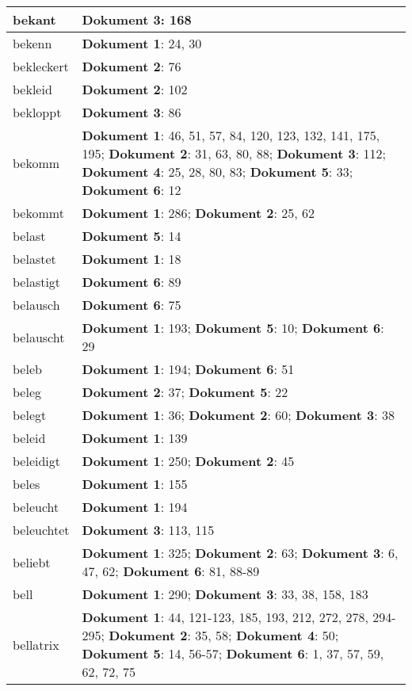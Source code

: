 \documentclass[a5paper]{article}
\begin{document}
\begin{longtable}[l]{|l|p{3in}|}
\hline
bekant & \textbf{Dokument 3}: 168 \\
\hline
bekenn & \textbf{Dokument 1}: 24, 30 \\
\hline
bekleckert & \textbf{Dokument 2}: 76 \\
\hline
bekleid & \textbf{Dokument 2}: 102 \\
\hline
bekloppt & \textbf{Dokument 3}: 86 \\
\hline
bekomm & \textbf{Dokument 1}: 46, 51, 57, 84, 120, 123, 132, 141, 175, 195; \textbf{Dokument 2}: 31, 63, 80, 88; \textbf{Dokument 3}: 112; \textbf{Dokument 4}: 25, 28, 80, 83; \textbf{Dokument 5}: 33; \textbf{Dokument 6}: 12 \\
\hline
bekommt & \textbf{Dokument 1}: 286; \textbf{Dokument 2}: 25, 62 \\
\hline
belast & \textbf{Dokument 5}: 14 \\
\hline
belastet & \textbf{Dokument 1}: 18 \\
\hline
belastigt & \textbf{Dokument 6}: 89 \\
\hline
belausch & \textbf{Dokument 6}: 75 \\
\hline
belauscht & \textbf{Dokument 1}: 193; \textbf{Dokument 5}: 10; \textbf{Dokument 6}: 29 \\
\hline
beleb & \textbf{Dokument 1}: 194; \textbf{Dokument 6}: 51 \\
\hline
beleg & \textbf{Dokument 2}: 37; \textbf{Dokument 5}: 22 \\
\hline
belegt & \textbf{Dokument 1}: 36; \textbf{Dokument 2}: 60; \textbf{Dokument 3}: 38 \\
\hline
beleid & \textbf{Dokument 1}: 139 \\
\hline
beleidigt & \textbf{Dokument 1}: 250; \textbf{Dokument 2}: 45 \\
\hline
beles & \textbf{Dokument 1}: 155 \\
\hline
beleucht & \textbf{Dokument 1}: 194 \\
\hline
beleuchtet & \textbf{Dokument 3}: 113, 115 \\
\hline
beliebt & \textbf{Dokument 1}: 325; \textbf{Dokument 2}: 63; \textbf{Dokument 3}: 6, 47, 62; \textbf{Dokument 6}: 81, 88-89 \\
\hline
bell & \textbf{Dokument 1}: 290; \textbf{Dokument 3}: 33, 38, 158, 183 \\
\hline
bellatrix & \textbf{Dokument 1}: 44, 121-123, 185, 193, 212, 272, 278, 294-295; \textbf{Dokument 2}: 35, 58; \textbf{Dokument 4}: 50; \textbf{Dokument 5}: 14, 56-57; \textbf{Dokument 6}: 1, 37, 57, 59, 62, 72, 75 \\

\end{longtable}
\end{document}
